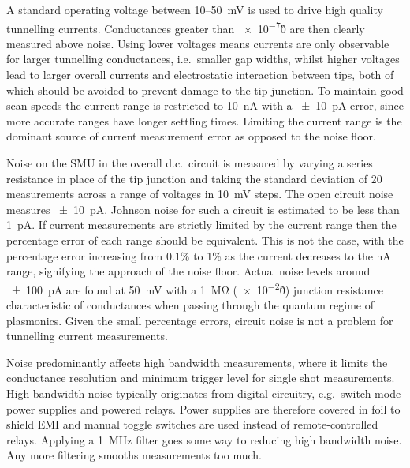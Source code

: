 \documentclass{article}
\begin{document}
A standard operating voltage between 10--\SI{50}{mV} is used to drive high quality tunnelling currents. Conductances greater than \num{e-7}\G0 are then clearly measured above noise. Using lower voltages means currents are only observable for larger tunnelling conductances, i.e.\ smaller gap widths, whilst higher voltages lead to larger overall currents and electrostatic interaction between tips, both of which should be avoided to prevent damage to the tip junction. To maintain good scan speeds the current range is restricted to \SI{10}{nA} with a \SI{\pm10}{pA} error, since more accurate ranges have longer settling times. Limiting the current range is the dominant source of current measurement error as opposed to the noise floor.

Noise on the SMU in the overall d.c.\ circuit is measured by varying a series resistance in place of the tip junction and taking the standard deviation of 20 measurements across a range of voltages in \SI{10}{mV} steps. The open circuit noise measures \SI{\pm10}{pA}. Johnson noise for such a circuit is estimated to be less than \SI{1}{pA}.
If current measurements are strictly limited by the current range then the percentage error of each range should be equivalent. This is not the case, with the percentage error increasing from \num{0.1}\% to \num{1}\% as the current decreases to the nA range, signifying the approach of the noise floor. Actual noise levels around \SI{\pm100}{pA} are found at \SI{50}{mV} with a \SI{1}{\mega\ohm} (\num{e-2}\G0) junction resistance characteristic of conductances when passing through the quantum regime of plasmonics. Given the small percentage errors, circuit noise is not a problem for tunnelling current measurements.

Noise predominantly affects high bandwidth measurements, where it limits the conductance resolution and minimum trigger level for single shot measurements. High bandwidth noise typically originates from digital circuitry, e.g.\ switch-mode power supplies and powered relays. Power supplies are therefore covered in foil to shield EMI and manual toggle switches are used instead of remote-controlled relays. Applying a \SI{1}{MHz} filter goes some way to reducing high bandwidth noise. Any more filtering smooths measurements too much.
\end{document}
